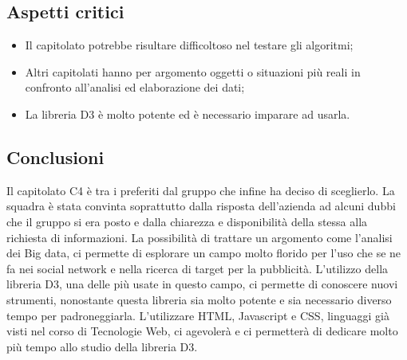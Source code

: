 \subsection{Aspetti critici}
\begin{itemize}
\item Il capitolato potrebbe risultare difficoltoso nel testare gli algoritmi;
\item Altri capitolati hanno per argomento oggetti o situazioni più reali in confronto all'analisi ed elaborazione dei dati;
\item La libreria D3 è molto potente ed è necessario imparare ad usarla.
\end{itemize}

\subsection{Conclusioni}
Il capitolato C4 è tra i preferiti dal gruppo che infine ha deciso di sceglierlo. La squadra è stata convinta soprattutto dalla risposta dell'azienda ad alcuni dubbi che il gruppo si era posto e dalla chiarezza e disponibilità della stessa alla richiesta di informazioni. La possibilità di trattare un argomento come l'analisi dei Big data, ci permette di esplorare un campo molto florido per l'uso che se ne fa nei social network e nella ricerca di target per la pubblicità. L'utilizzo della libreria D3, una delle più usate in questo campo, ci permette di conoscere nuovi strumenti, nonostante questa libreria sia molto potente e sia necessario diverso tempo per padroneggiarla. L'utilizzare HTML, Javascript e CSS, linguaggi già visti nel corso di Tecnologie Web, ci agevolerà e ci permetterà di dedicare molto più tempo allo studio della libreria D3.
